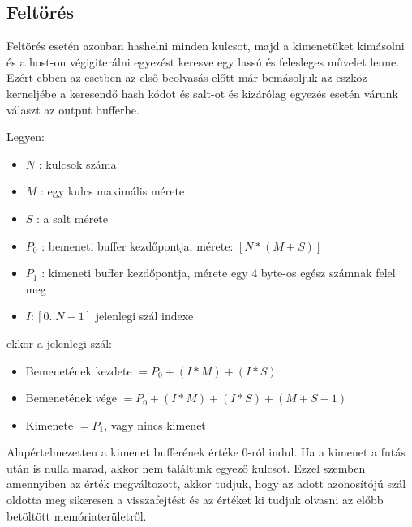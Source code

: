 \subsection{Feltörés}

Feltörés esetén azonban hashelni minden kulcsot, majd a kimenetüket kimásolni és a host-on végigiterálni egyezést keresve egy lassú és felesleges művelet lenne. Ezért ebben az esetben az első beolvasás előtt már bemásoljuk az eszköz kerneljébe a keresendő hash kódot és salt-ot és kizárólag egyezés esetén várunk választ az output bufferbe.

Legyen:
\begin{itemize}
    \itemsep-0.5em
    \item $ N $ : kulcsok száma
    \item $ M $ : egy kulcs maximális mérete
    \item $ S $ : a salt mérete
    \item $ P_0 $ : bemeneti buffer kezdőpontja, mérete: $[N * (M + S)]$
    \item $ P_1 $ : kimeneti buffer kezdőpontja, mérete egy 4 byte-os egész számnak felel meg
    \item $ I : [0 .. N-1]$ jelenlegi szál indexe
\end{itemize}


ekkor a jelenlegi szál:


\begin{itemize}
    \itemsep-0.5em
    \item Bemenetének kezdete $ = P_0 + (I * M) + (I * S) $
    \item Bemenetének vége $ = P_0 + (I * M) + (I * S) + (M + S - 1) $
    \item Kimenete $ = P_1 $, vagy nincs kimenet
\end{itemize}

Alapértelmezetten a kimenet bufferének értéke 0-ról indul. Ha a kimenet a futás után is nulla marad, akkor nem találtunk egyező kulcsot. Ezzel szemben amennyiben az érték megváltozott, akkor tudjuk, hogy az adott azonosítójú szál oldotta meg sikeresen a visszafejtést és az értéket ki tudjuk olvasni az előbb betöltött memóriaterületről.


